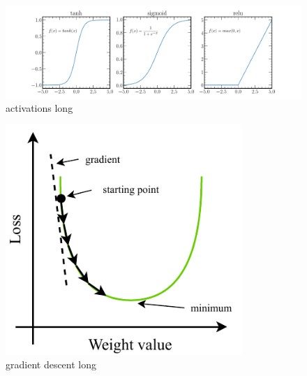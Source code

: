 \begin{figure} %
    \includegraphics[width=\textwidth]{diagrams/6-cvn/activations.pdf}
    \caption[activations short]
    {activations long}
    \label{fig:activations}
\end{figure} %

\begin{figure} %
    \includegraphics[width=0.8\textwidth]{diagrams/6-cvn/gradient_descent.pdf}
    \caption[gradient descent short]
    {gradient descent long}
    \label{fig:gradient_descent}
\end{figure} %

